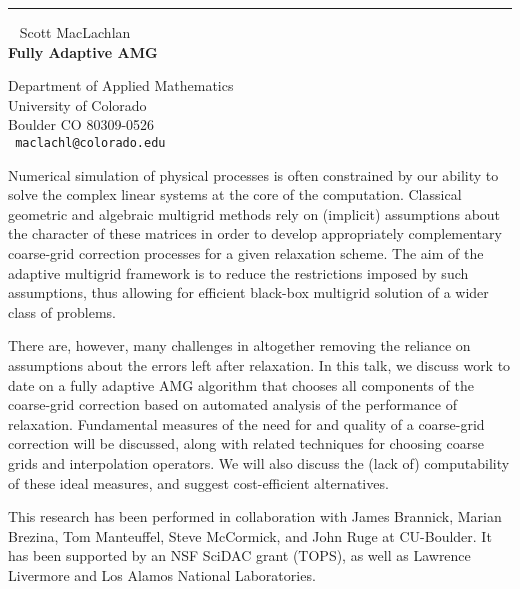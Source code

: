 \documentclass{report}
\begin{document}
\begin{center}

\rule{6in}{1pt} \
{\large
Scott MacLachlan
\\ {\bf
Fully Adaptive AMG
}}

Department of Applied Mathematics \\
University of Colorado \\
Boulder CO 80309-0526
\\ {\tt
maclachl@colorado.edu
}
\end{center}

Numerical simulation of physical processes is often constrained by our
ability to solve the complex linear systems at the core of the
computation. Classical geometric and algebraic multigrid methods rely
on (implicit) assumptions about the character of these matrices in
order to develop appropriately complementary coarse-grid correction
processes for a given relaxation scheme. The aim of the adaptive
multigrid framework is to reduce the restrictions imposed by such
assumptions, thus allowing for efficient black-box multigrid solution
of a wider class of problems.

There are, however, many challenges in altogether removing the reliance
on assumptions about the errors left after relaxation. In this talk, we
discuss work to date on a fully adaptive AMG algorithm that chooses all
components of the coarse-grid correction based on automated analysis of
the performance of relaxation. Fundamental measures of the need for and
quality of a coarse-grid correction will be discussed, along with
related techniques for choosing coarse grids and interpolation
operators. We will also discuss the (lack of) computability of these
ideal measures, and suggest cost-efficient alternatives.

This research has been performed in collaboration with James Brannick,
Marian Brezina, Tom Manteuffel, Steve McCormick, and John Ruge at
CU-Boulder. It has been supported by an NSF SciDAC grant (TOPS), as
well as Lawrence Livermore and Los Alamos National Laboratories.
\end{document}
